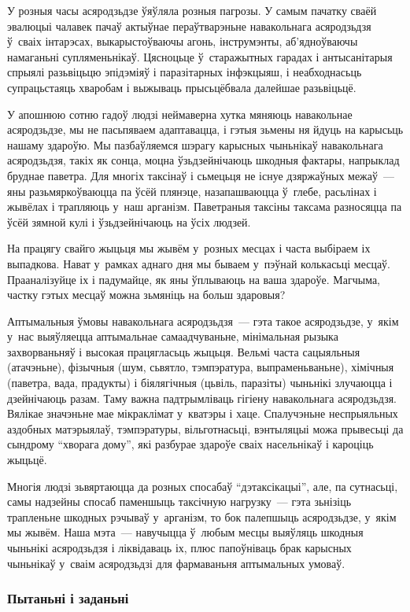 У розныя часы асяродзьдзе ўяўляла розныя пагрозы. У самым пачатку сваёй эвалюцыі чалавек пачаў актыўнае пераўтварэньне навакольнага асяродзьдзя ў~сваіх інтарэсах, выкарыстоўваючы агонь, інструмэнты, аб'ядноўваючы намаганьні супляменьнікаў. Цясноцьце ў~старажытных гарадах і антысанітарыя спрыялі разьвіцьцю эпідэміяў і паразітарных інфэкцыяш, і неабходнасьць супрацьстаяць хваробам і выжываць прысьцёбвала далейшае разьвіцьцё.

У апошнюю сотню гадоў людзі неймаверна хутка мяняюць навакольнае асяродзьдзе, мы не пасьпяваем адаптавацца, і гэтыя зьмены ня йдуць на карысьць нашаму здароўю. Мы пазбаўляемся шэрагу карысных чыньнікаў навакольнага асяродзьдзя, такіх як сонца, моцна ўзьдзейнічаюць шкодныя фактары, напрыклад бруднае паветра. Для многіх таксінаў і сьмецьця не існуе дзяржаўных межаў~--- яны разьмяркоўваюцца па ўсёй плянэце, назапашваюцца ў~глебе, расьлінах і жывёлах і трапляюць у~наш арганізм. Паветраныя таксіны таксама разносяцца па ўсёй зямной кулі і ўзьдзейнічаюць на ўсіх людзей.

На працягу свайго жыцьця мы жывём у~розных месцах і часта выбіраем іх выпадкова. Нават у~рамках аднаго дня мы бываем у~пэўнай колькасьці месцаў. Прааналізуйце іх і падумайце, як яны ўплываюць на ваша здароўе. Магчыма, частку гэтых месцаў можна зьмяніць на больш здаровыя?

Аптымальныя ўмовы навакольнага асяродзьдзя~--- гэта такое асяродзьдзе, у~якім у~нас выяўляецца аптымальнае самаадчуваньне, мінімальная рызыка захворваньняў і высокая працягласьць жыцьця. Вельмі часта сацыяльныя (атачэньне), фізычныя (шум, сьвятло, тэмпэратура, выпраменьваньне), хімічныя (паветра, вада, прадукты) і біялягічныя (цьвіль, паразіты) чыньнікі злучаюцца і дзейнічаюць разам. Таму важна падтрымліваць гігіену навакольнага асяродзьдзя. Вялікае значэньне мае мікраклімат у~кватэры і хаце. Спалучэньне неспрыяльных аздобных матэрыялаў, тэмпэратуры, вільготнасьці, вэнтыляцыі можа прывесьці да сындрому ``хворага дому'', які разбурае здароўе сваіх насельнікаў і кароціць жыцьцё.

Многія людзі зьвяртаюцца да розных спосабаў ``дэтаксікацыі'', але, па сутнасьці, самы надзейны спосаб паменшыць таксічную нагрузку~--- гэта зьнізіць трапленьне шкодных рэчываў у~арганізм, то бок палепшыць асяродзьдзе, у~якім мы жывём. Наша мэта~--- навучыцца ў~любым месцы выяўляць шкодныя чыньнікі асяродзьдзя і ліквідаваць іх, плюс папоўніваць брак карысных чыньнікаў у~сваім асяродзьдзі для фармаваньня аптымальных умоваў.

\subsubsection{Пытаньні і заданьні}

